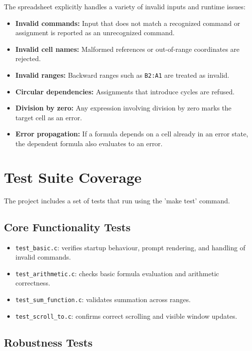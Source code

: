 \documentclass[12pt,a4paper]{article}
\begin{document}
The spreadsheet explicitly handles a variety of invalid inputs and runtime issues:

\begin{itemize}
    \item \textbf{Invalid commands:} Input that does not match a recognized command or assignment is reported as an unrecognized command.
    \item \textbf{Invalid cell names:} Malformed references or out-of-range coordinates are rejected.
    \item \textbf{Invalid ranges:} Backward ranges such as \texttt{B2:A1} are treated as invalid.
    \item \textbf{Circular dependencies:} Assignments that introduce cycles are refused.
    \item \textbf{Division by zero:} Any expression involving division by zero marks the target cell as an error.
    \item \textbf{Error propagation:} If a formula depends on a cell already in an error state, the dependent formula also evaluates to an error.
\end{itemize}


\section{Test Suite Coverage}

The project includes a set of tests that run using the 'make test' command.

\subsection{Core Functionality Tests}

\begin{itemize}
    \item \texttt{test\_basic.c}: verifies startup behaviour, prompt rendering, and handling of invalid commands.
    \item \texttt{test\_arithmetic.c}: checks basic formula evaluation and arithmetic correctness.
    \item \texttt{test\_sum\_function.c}: validates summation across ranges.
    \item \texttt{test\_scroll\_to.c}: confirms correct scrolling and visible window updates.
\end{itemize}

\subsection{Robustness Tests}
\end{document}
